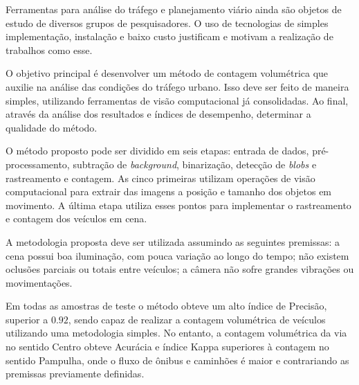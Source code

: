 


Ferramentas para análise do tráfego e planejamento viário ainda são objetos de estudo de diversos grupos de pesquisadores. O uso de tecnologias de simples implementação, instalação e baixo custo justificam e motivam a realização de trabalhos como esse.

O objetivo principal é desenvolver um método de contagem volumétrica que auxilie na análise das condições do tráfego urbano. Isso deve ser feito de maneira simples, utilizando ferramentas de visão computacional já consolidadas. Ao final, através da análise dos resultados e índices de desempenho, determinar a qualidade do método.

O método proposto pode ser dividido em seis etapas: entrada de dados, pré-processamento, subtração de \textit{background}, binarização, detecção de \textit{blobs} e rastreamento e contagem. As cinco primeiras utilizam operações de visão computacional para extrair das imagens a posição e tamanho dos objetos em movimento. A última etapa utiliza esses pontos para implementar o rastreamento e contagem dos veículos em cena.

A metodologia proposta deve ser utilizada assumindo as seguintes premissas: a cena possui boa iluminação, com pouca variação ao longo do tempo; não existem oclusões parciais ou totais entre veículos; a câmera não sofre grandes vibrações ou movimentações.

Em todas as amostras de teste o método obteve um alto índice de Precisão, superior a $0.92$, sendo capaz de realizar a contagem volumétrica de veículos utilizando uma metodologia simples. No entanto, a contagem volumétrica da via no sentido Centro obteve Acurácia e índice Kappa superiores à contagem no sentido Pampulha, onde o fluxo de ônibus e caminhões é maior e contrariando as premissas previamente definidas.

